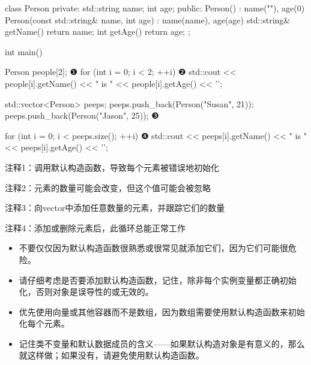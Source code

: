 \begin{cpp}
class Person {
  private:
  std::string name;
  int age;
public:
  Person() : name(""), age(0) {}
  Person(const std::string& name, int age) : name(name), age(age) {}
  std::string& getName() { return name; }
  int getAge() { return age; }
};

int main() {
  Person people[2]; ❶
  for (int i = 0; i < 2; ++i) ❷
    std::cout << people[i].getName() << " is " << people[i].getAge() << '\n';

    std::vector<Person> peeps;
  peeps.push_back(Person("Susan", 21));
  peeps.push_back(Person("Jason", 25)); ❸

  for (int i = 0; i < peeps.size(); ++i) ❹
    std::cout << peeps[i].getName() << " is " << peeps[i].getAge() << '\n';
}
\end{cpp}

{\footnotesize
注释1：调用默认构造函数，导致每个元素被错误地初始化

注释2：元素的数量可能会改变，但这个值可能会被忽略

注释3：向vector中添加任意数量的元素，并跟踪它们的数量

注释4：添加或删除元素后，此循环总能正常工作
}


\begin{itemize}
\item
不要仅仅因为默认构造函数很熟悉或很常见就添加它们，因为它们可能很危险。

\item
请仔细考虑是否要添加默认构造函数，记住，除非每个实例变量都正确初始化，否则对象是误导性的或无效的。

\item
优先使用向量或其他容器而不是数组，因为数组需要使用默认构造函数来初始化每个元素。

\item
记住类不变量和默认数据成员的含义——如果默认构造对象是有意义的，那么就这样做；如果没有，请避免使用默认构造函数。
\end{itemize}







